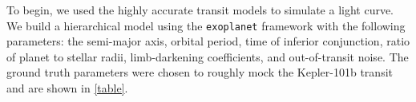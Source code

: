 \documentclass[RNAAS]{aastex631}
\begin{document}
To begin, we used the highly accurate \citet{2020AJ....159..123A} transit models to simulate a light curve. We build a hierarchical model using the \texttt{exoplanet} framework with the following parameters: the semi-major axis, orbital period, time of inferior conjunction, ratio of planet to stellar radii, limb-darkening coefficients, and out-of-transit noise. The ground truth parameters were chosen to roughly mock the Kepler-101b transit \citep{2014A&A...572A...2B} and are shown in \autoref{table}.





{}

\end{document}
